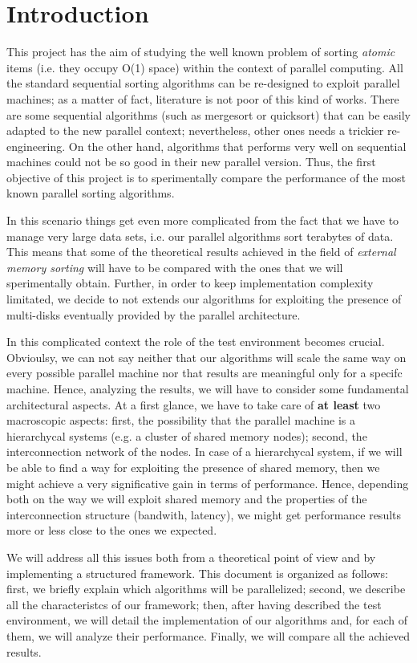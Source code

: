 \section{Introduction}
This project has the aim of studying the well known problem of sorting \textit{atomic} items (i.e. they occupy O(1) space) within the context of parallel computing. All the standard sequential sorting algorithms can be re-designed to exploit parallel machines; as a matter of fact, literature is not poor of this kind of works. There are some sequential algorithms (such as mergesort or quicksort) that can be easily adapted to the new parallel context; nevertheless, other ones needs a trickier re-engineering. On the other hand, algorithms that performs very well on sequential machines could not be so good in their new parallel version. Thus, the first objective of this project is to sperimentally compare the performance of the most known parallel sorting algorithms. 

In this scenario things get even more complicated from the fact that we have to manage very large data sets, i.e. our parallel algorithms sort terabytes of data. This means that some of the theoretical results achieved in the field of \textit{external memory sorting} will have to be compared with the ones that we will sperimentally obtain. Further, in order to keep implementation complexity limitated, we decide to not extends our algorithms for exploiting the presence of multi-disks eventually provided by the parallel architecture. 

In this complicated context the role of the test environment becomes crucial. Obvioulsy, we can not say neither that our algorithms will scale the same way on every possible parallel machine nor that results are meaningful only for a specifc machine. Hence, analyzing the results, we will have to consider some fundamental architectural aspects. At a first glance, we have to take care of \textbf{at least} two macroscopic aspects: first, the possibility that the parallel machine is a hierarchycal systems (e.g. a cluster of shared memory nodes); second, the interconnection network of the nodes. In case of a hierarchycal system, if we will be able to find a way for exploiting the presence of shared memory, then we might achieve a very significative gain in terms of performance. Hence, depending both on the way we will exploit shared memory and the properties of the interconnection structure (bandwith, latency), we might get performance results more or less close to the ones we expected.

We will address all this issues both from a theoretical point of view and by implementing a structured framework. This document is organized as follows: first, we briefly explain which algorithms will be parallelized; second, we describe all the characteristcs of our framework; then, after having described the test environment, we will detail the implementation of our algorithms and, for each of them, we will analyze their performance. Finally, we will compare all the achieved results.